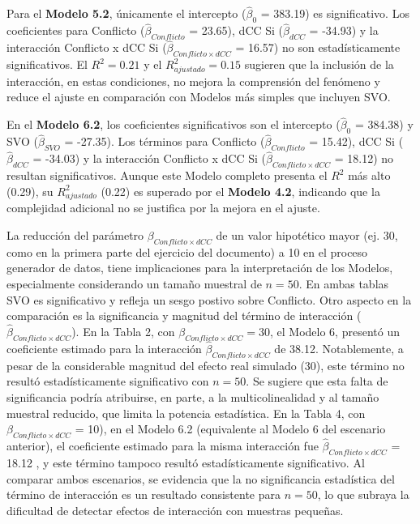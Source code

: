 \documentclass[
  spanish,
  10pt,
]{article}
\begin{document}
Para el \textbf{Modelo 5.2}, únicamente el intercepto
(\(\hat{\beta}_{0}\) = 383.19) es significativo. Los coeficientes para
Conflicto (\(\hat{\beta}_{Conflicto}\) = 23.65), dCC Si
(\(\hat{\beta}_{dCC}\) = -34.93) y la interacción Conflicto x dCC Si
(\(\hat{\beta}_{Conflicto \times dCC}\) = 16.57) no son estadísticamente
significativos. El \(R^2 = 0.21\) y el \(R^2_{ajustado} = 0.15\)
sugieren que la inclusión de la interacción, en estas condiciones, no
mejora la comprensión del fenómeno y reduce el ajuste en comparación con
Modelos más simples que incluyen SVO.

En el \textbf{Modelo 6.2}, los coeficientes significativos son el
intercepto (\(\hat{\beta}_{0}\) = 384.38) y SVO (\(\hat{\beta}_{SVO}\) =
-27.35). Los términos para Conflicto (\(\hat{\beta}_{Conflicto}\) =
15.42), dCC Si (\(\hat{\beta}_{dCC}\) = -34.03) y la interacción
Conflicto x dCC Si (\(\hat{\beta}_{Conflicto \times dCC}\) = 18.12) no
resultan significativos. Aunque este Modelo completo presenta el \(R^2\)
más alto (0.29), su \(R^2_{ajustado}\) (0.22) es superado por el
\textbf{Modelo 4.2}, indicando que la complejidad adicional no se
justifica por la mejora en el ajuste.

La reducción del parámetro \(\beta_{Conflicto \times dCC}\) de un valor
hipotético mayor (ej. 30, como en la primera parte del ejercicio del
documento) a 10 en el proceso generador de datos, tiene implicaciones
para la interpretación de los Modelos, especialmente considerando un
tamaño muestral de \(n=50\). En ambas tablas SVO es significativo y
refleja un sesgo postivo sobre Conflicto. Otro aspecto en la comparación
es la significancia y magnitud del término de interacción
(\(\hat{\beta}_{Conflicto \times dCC}\)). En la Tabla 2, con
\(\beta_{Conflicto \times dCC} = 30\), el Modelo 6, presentó un
coeficiente estimado para la interacción
\(\hat\beta_{Conflicto \times dCC}\) de 38.12. Notablemente, a pesar de
la considerable magnitud del efecto real simulado (30), este término no
resultó estadísticamente significativo con \(n=50\). Se sugiere que esta
falta de significancia podría atribuirse, en parte, a la
multicolinealidad y al tamaño muestral reducido, que limita la potencia
estadística. En la Tabla 4, con \(\beta_{Conflicto \times dCC}\) = 10),
en el Modelo 6.2 (equivalente al Modelo 6 del escenario anterior), el
coeficiente estimado para la misma interacción fue
\(\hat{\beta}_{Conflicto \times dCC}\) = 18.12 , y este término tampoco
resultó estadísticamente significativo. Al comparar ambos escenarios, se
evidencia que la no significancia estadística del término de interacción
es un resultado consistente para \(n=50\), lo que subraya la dificultad
de detectar efectos de interacción con muestras pequeñas.
\end{document}
